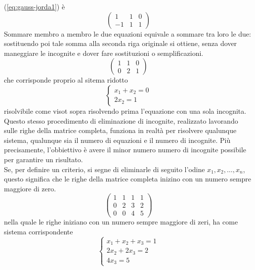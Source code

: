 \documentclass{book}
\theoremstyle{definition}
\theoremstyle{plain}
\begin{document}
(\ref{eq:gauss-jorda1}) è
\begin{equation}
  \label{eq:gauss-jorda2}
  \begin{pmatrix}
    1 & 1 & 0\\
    -1 & 1 & 1
  \end{pmatrix}
\end{equation}
Sommare membro a membro le due equazioni equivale a sommare tra loro le
due: sostituendo poi tale somma alla seconda riga originale si ottiene,
senza dover maneggiare le incognite e dover fare sostituzioni o
semplificazioni.
\begin{equation}
  \label{eq:gauss-jorda3}
  \begin{pmatrix}
    1 & 1 & 0\\
    0 & 2 & 1
  \end{pmatrix}
\end{equation}
che corrisponde proprio al sitema ridotto
\begin{equation*}
  \begin{cases}
    x_1+x_2=0\\
    2x_2=1
  \end{cases}
\end{equation*}
risolvibile come visot sopra risolvendo prima l'equazione con una sola
incognita.\\
Questo stesso procedimento di eliminazione di incognite, realizzato
lavorando sulle righe della matrice completa, funziona in realtà per
risolvere qualunque sistema, qualunque sia il numero di equazioni e il
numero di incognite. Più precisamente, l'obbiettivo è avere il minor
numero numero di incognite possibile per garantire un risultato.\\
Se, per definire un criterio, si segne di eliminarle di seguito l'odine
$x_1,x_2,\dots, x_n$, questo significa che le righe della matrice completa
inizino con un numero sempre maggiore di zero.
\begin{equation*}
  \begin{pmatrix}
    1 & 1 & 1 & 1\\
    0 & 2 & 3 & 2\\
    0 & 0 & 4 & 5
  \end{pmatrix}
\end{equation*}
nella quale le righe iniziano con un numero sempre maggiore di zeri, ha
come sistema corrispondente
\begin{equation*}
  \begin{cases}
    x_1+x_2+x_3=1\\
    2x_2+2x_3=2\\
    4x_3=5
  \end{cases}
\end{equation*}
\end{document}
